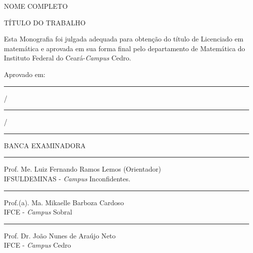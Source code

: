 
\begin{titlepage}
    \begin{center}
		
		\vspace{0.5cm}		
		NOME COMPLETO
		\vspace{0.5cm}
	\end{center}

		
	\begin{center}		
		\vspace{1cm}
		{\large {TÍTULO DO TRABALHO\\}}
		
		\vspace{3cm}
	\end{center}
	
	\begin{flushright}
	\begin{minipage}[l]{8cm}
	Esta Monografia foi julgada adequada para obtenção do título de Licenciado em matemática e aprovada em sua forma final pelo departamento de Matemática do Instituto Federal do Ceará-\textit{Campus} Cedro.
	
		\end{minipage}
\end{flushright}
			\vspace{3cm}

	Aprovado em: \rule{1.5cm}{0.1mm} / \rule{1.5cm}{0.1mm} / \rule{1.5cm}{0.1mm}
	
	\vspace{1.5cm}
	\begin{center}
	 	BANCA EXAMINADORA
	\end{center}
		
	\vspace{0.7cm}
	\begin{center}
		
		\rule{11cm}{0.1mm}
		
		Prof. Me. Luiz Fernando Ramos Lemos (Orientador)\\
		IFSULDEMINAS - \textit{Campus} Inconfidentes.
		
		
		\vspace{0.8cm}
		
		\rule{11cm}{0.1mm}
		
		Prof.(a). Ma. Mikaelle Barboza Cardoso\\
		IFCE - \textit{Campus} Sobral
		
		
		\vspace{0.8cm}
		\rule{11cm}{0.1mm}
		
		Prof. Dr. João Nunes de Araújo Neto\\
		IFCE - \textit{Campus} Cedro

		\vspace{3cm}
		

		

		
	\end{center}
	 \vfill
	 \centering
		
\end{titlepage}

